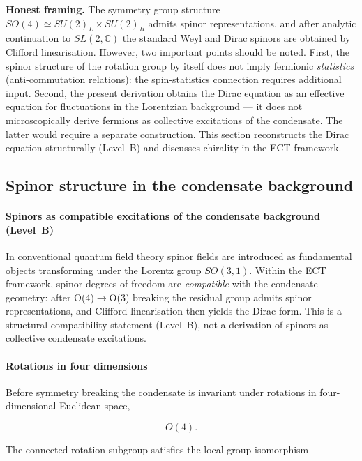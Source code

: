 \documentclass[11pt,a4paper]{article}
\numberwithin{equation}{section}
\begin{document}
\textbf{Honest framing.}
The symmetry group structure $SO(4)\simeq SU(2)_L\times SU(2)_R$
admits spinor representations, and after analytic continuation to
$SL(2,\mathbb{C})$ the standard Weyl and Dirac spinors are obtained
by Clifford linearisation.  However, two important points should be
noted.  First, the spinor structure of the rotation group by itself
does not imply fermionic \emph{statistics} (anti-commutation
relations): the spin-statistics connection requires additional input.
Second, the present derivation obtains the Dirac equation as an
effective equation for fluctuations in the Lorentzian background ---
it does not microscopically derive fermions as collective excitations
of the condensate.  The latter would require a separate construction.
This section reconstructs the Dirac equation structurally (Level~B) and discusses chirality
in the ECT framework.

\subsection{Spinor structure in the condensate background}

\paragraph{Spinors as compatible excitations of the condensate background (Level~B)}

In conventional quantum field theory spinor fields are introduced as
fundamental objects transforming under the Lorentz group $SO(3,1)$.
Within the ECT framework, spinor degrees of freedom are
\emph{compatible} with the condensate geometry: after O(4)$\to$O(3)
breaking the residual group admits spinor representations, and
Clifford linearisation then yields the Dirac form.
This is a structural compatibility statement (Level~B),
not a derivation of spinors as collective condensate excitations.

\paragraph{Rotations in four dimensions}

Before symmetry breaking the condensate is invariant under rotations in
four-dimensional Euclidean space,

\begin{equation}
O(4).
\end{equation}

The connected rotation subgroup satisfies the local group isomorphism
\end{document}
